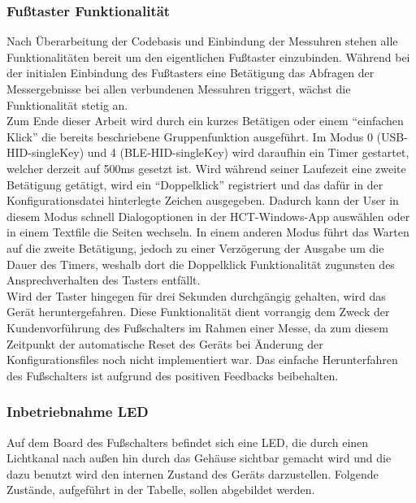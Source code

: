 \subsubsection{Fußtaster Funktionalität}
\label{FußtasterFunktionalität}
Nach Überarbeitung der Codebasis und Einbindung der Messuhren stehen alle Funktionalitäten bereit um den eigentlichen Fußtaster einzubinden. Während bei der initialen Einbindung des Fußtasters eine Betätigung das Abfragen der Messergebnisse bei allen verbundenen Messuhren triggert, wächst die Funktionalität stetig an.\\
Zum Ende dieser Arbeit wird durch ein kurzes Betätigen oder einem ``einfachen Klick'' die bereits beschriebene Gruppenfunktion ausgeführt. Im Modus 0 (USB-\ac{HID}-singleKey) und 4 (\ac{BLE}-\ac{HID}-singleKey) wird daraufhin ein Timer gestartet, welcher derzeit auf 500ms gesetzt ist. Wird während seiner Laufezeit eine zweite Betätigung getätigt, wird ein ``Doppelklick'' registriert und das dafür in der Konfigurationsdatei hinterlegte Zeichen ausgegeben. Dadurch kann der User in diesem Modus schnell Dialogoptionen in der \ac{HCT}-Windows-App auswählen oder in einem Textfile die Seiten wechseln. In einem anderen Modus führt das Warten auf die zweite Betätigung, jedoch zu einer Verzögerung der Ausgabe um die Dauer des Timers, weshalb dort die Doppelklick Funktionalität zugunsten des Ansprechverhalten des Tasters entfällt.\\
Wird der Taster hingegen für drei Sekunden durchgängig gehalten, wird das Gerät heruntergefahren. Diese Funktionalität dient vorrangig dem Zweck der Kundenvorführung des Fußschalters im Rahmen einer Messe, da zum diesem Zeitpunkt der automatische Reset des Geräts bei Änderung der Konfigurationsfiles noch nicht implementiert war. Das einfache Herunterfahren des Fußschalters ist aufgrund des positiven Feedbacks beibehalten.

\subsubsection{Inbetriebnahme LED}
Auf dem Board des Fußschalters befindet sich eine \ac{LED}, die durch einen Lichtkanal nach außen hin durch das Gehäuse sichtbar gemacht wird und die dazu benutzt wird den internen Zustand des Geräts darzustellen. Folgende Zustände, aufgeführt in der Tabelle, sollen abgebildet werden.

